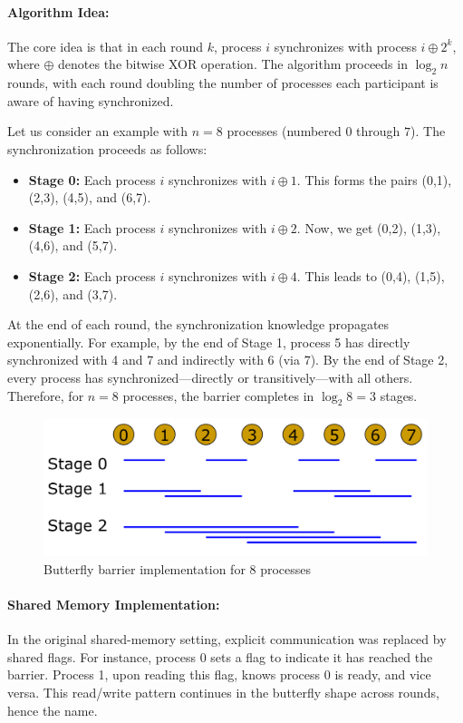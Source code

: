 \documentclass[12pt]{book}
\begin{document}
\paragraph{Algorithm Idea:}  
The core idea is that in each round $k$, process $i$ synchronizes with process $i \oplus 2^k$, where $\oplus$ denotes the bitwise XOR operation. The algorithm proceeds in $\log_2 n$ rounds, with each round doubling the number of processes each participant is aware of having synchronized.

Let us consider an example with $n = 8$ processes (numbered $0$ through $7$). The synchronization proceeds as follows:

\begin{itemize}
    \item \textbf{Stage 0:} Each process $i$ synchronizes with $i \oplus 1$. This forms the pairs (0,1), (2,3), (4,5), and (6,7).
    \item \textbf{Stage 1:} Each process $i$ synchronizes with $i \oplus 2$. Now, we get (0,2), (1,3), (4,6), and (5,7).
    \item \textbf{Stage 2:} Each process $i$ synchronizes with $i \oplus 4$. This leads to (0,4), (1,5), (2,6), and (3,7).
\end{itemize}

At the end of each round, the synchronization knowledge propagates exponentially. For example, by the end of Stage 1, process 5 has directly synchronized with 4 and 7 and indirectly with 6 (via 7). By the end of Stage 2, every process has synchronized—directly or transitively—with all others. Therefore, for $n=8$ processes, the barrier completes in $\log_2 8 = 3$ stages.

\begin{figure}[ht]
    \centering
    \includegraphics[width=0.6\linewidth]{images/Butterfly_barrier.png}
    \caption{Butterfly barrier implementation for 8 processes}
    \label{fig:butterfuly_barrier}
\end{figure}

\paragraph{Shared Memory Implementation:}  
In the original shared-memory setting, explicit communication was replaced by shared flags. For instance, process 0 sets a flag to indicate it has reached the barrier. Process 1, upon reading this flag, knows process 0 is ready, and vice versa. This read/write pattern continues in the butterfly shape across rounds, hence the name.
\end{document}
